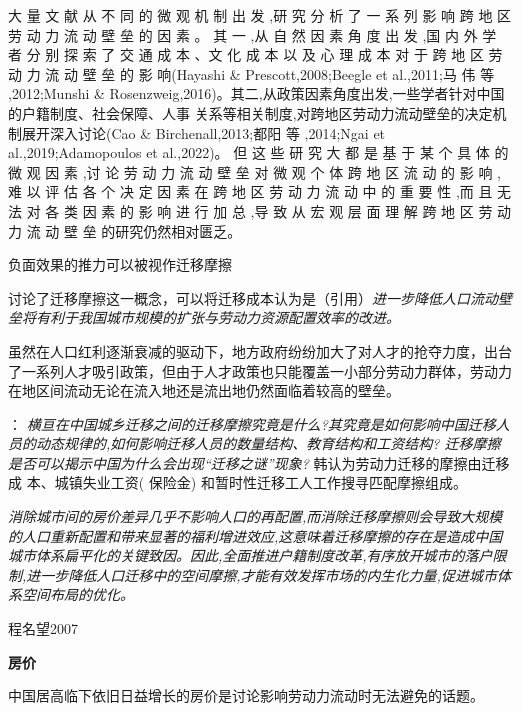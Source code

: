 \documentclass[a4paper,12pt,oneside]{book} %
\begin{document}
大 量 文 献 从 不 同 的 微 观 机 制 出 发 ,研 究 分 析 了 一 系 列 影 响 跨 地 区 劳 动 力 流 动 壁 垒 的 因 素 。 其 一 ,从 自 然 因 素 角 度 出 发 ,国 内 外 学 者 分 别 探 索 了 交 通 成 本 、文 化 成 本 以 及 心 理 成 本 对 于  跨 地 区 劳 动 力 流 动 壁 垒 的 影 响(Hayashi \& Prescott,2008;Beegle et al.,2011;马 伟 等 ,2012;Munshi \& Rosenzweig,2016)。其二,从政策因素角度出发,一些学者针对中国的户籍制度、社会保障、人事 关系等相关制度,对跨地区劳动力流动壁垒的决定机制展开深入讨论(Cao \& Birchenall,2013;都阳  等 ,2014;Ngai et al.,2019;Adamopoulos et al.,2022)。 但 这 些 研 究 大 都 是 基 于 某 个 具 体 的 微 观 因 素 ,讨 论 劳 动 力 流 动 壁 垒 对 微 观 个 体 跨 地 区 流 动 的 影 响 ,难 以 评 估 各 个 决 定 因 素 在 跨 地 区 劳 动 力 流 动 中 的 重 要 性 ,而 且 无 法 对 各 类 因 素 的 影 响 进 行 加 总 ,导 致 从 宏 观 层 面 理 解 跨 地 区 劳 动 力 流 动 壁 垒 的研究仍然相对匮乏。

负面效果的推力可以被视作迁移摩擦

\cite{WangLiLiWoGuoRenKouQianYiChengBenChengShiGuiMoYuShengChanLu2020}讨论了迁移摩擦这一概念，可以将迁移成本认为是（引用）\textit{进一步降低人口流动壁垒将有利于我国城市规模的扩张与劳动力资源配置效率的改进。}

虽然在人口红利逐渐衰减的驱动下，地方政府纷纷加大了对人才的抢夺力度，出台了一系列人才吸引政策，但由于人才政策也只能覆盖一小部分劳动力群体，劳动力在地区间流动无论在流入地还是流出地仍然面临着较高的壁垒。

\cite{HanQiHengNongCunLaoDongLiQianYiMoCaYingXiangNongMinGongShuLiangYuGongZiJieGouMa2018}：
\textit{横亘在中国城乡迁移之间的迁移摩擦究竟是什么?其究竟是如何影响中国迁移人员的动态规律的,如何影响迁移人员的数量结构、教育结构和工资结构? 迁移摩擦是否可以揭示中国为什么会出现“迁移之谜”现象?}
韩认为劳动力迁移的摩擦由迁移成 本、城镇失业工资( 保险金) 和暂时性迁移工人工作搜寻匹配摩擦组成。

\cite{LiuXiuYanFangJieQianYiMoCaYuZhongGuoChengShiDeGuiMoFenBuLiLunMoXingYuJieGouShiGuJi2017}
\textit{消除城市间的房价差异几乎不影响人口的再配置,而消除迁移摩擦则会导致大规模的人口重新配置和带来显著的福利增进效应,这意味着迁移摩擦的存在是造成中国城市体系扁平化的关键致因。因此,全面推进户籍制度改革,有序放开城市的落户限制,进一步降低人口迁移中的空间摩擦,才能有效发挥市场的内生化力量,促进城市体系空间布局的优化。}


程名望2007




\textbf{房价}

中国居高临下依旧日益增长的房价是讨论影响劳动力流动时无法避免的话题。
\end{document}
